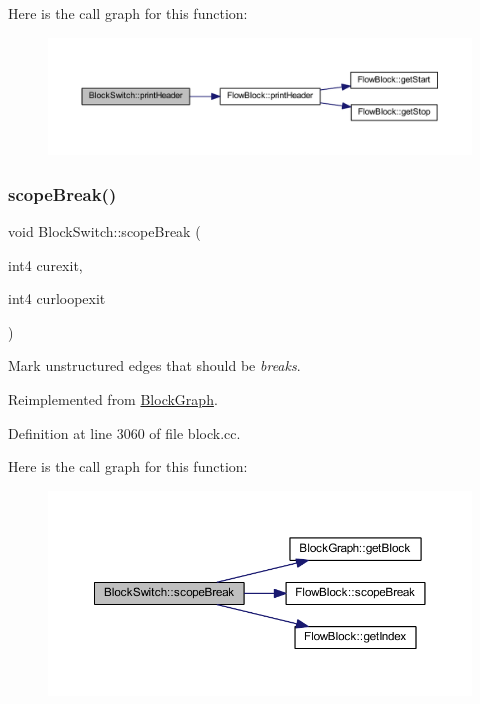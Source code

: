 Here is the call graph for this function\+:
\nopagebreak
\begin{figure}[H]
\begin{center}
\leavevmode
\includegraphics[width=350pt]{class_block_switch_a57143ab3d1cea8c6962bdcf52fbe4bdf_cgraph}
\end{center}
\end{figure}
\mbox{\label{class_block_switch_a85ad912114b4e2ac355ac2bc2f3be12c}} 
\subsubsection{\texorpdfstring{scopeBreak()}{scopeBreak()}}
{\footnotesize\ttfamily void Block\+Switch\+::scope\+Break (\begin{DoxyParamCaption}\item[{int4}]{curexit,  }\item[{int4}]{curloopexit }\end{DoxyParamCaption})\hspace{0.3cm}{\ttfamily [virtual]}}



Mark unstructured edges that should be {\itshape breaks}. 



Reimplemented from \mbox{\hyperlink{class_block_graph_a55618dfd49266bd4185d119f08e8b630}{Block\+Graph}}.



Definition at line 3060 of file block.\+cc.

Here is the call graph for this function\+:
\nopagebreak
\begin{figure}[H]
\begin{center}
\leavevmode
\includegraphics[width=350pt]{class_block_switch_a85ad912114b4e2ac355ac2bc2f3be12c_cgraph}
\end{center}
\end{figure}


